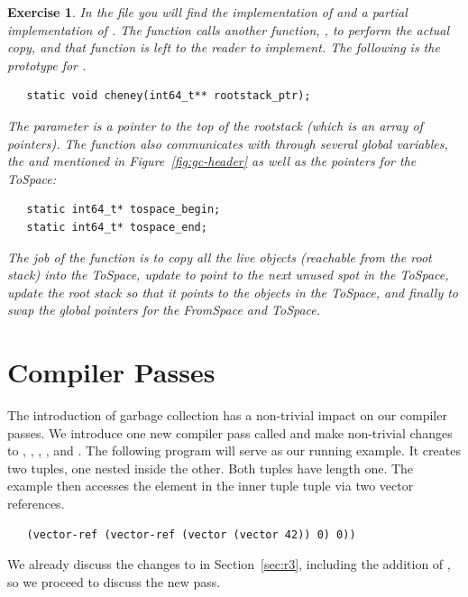 \documentclass[11pt]{book}
\newtheorem{exercise}[theorem]{Exercise}
\begin{document}
\begin{exercise}
  In the file  you will find the implementation of
   and a partial implementation of .
  The  function calls another function, ,
  to perform the actual copy, and that function is left to the reader
  to implement. The following is the prototype for .
\begin{lstlisting}
   static void cheney(int64_t** rootstack_ptr);
\end{lstlisting}
  The parameter  is a pointer to the top of the
  rootstack (which is an array of pointers).  The  function
  also communicates with  through several global
  variables, the  and 
  mentioned in Figure~\ref{fig:gc-header} as well as the pointers for
  the ToSpace:
\begin{lstlisting}
   static int64_t* tospace_begin;
   static int64_t* tospace_end;
\end{lstlisting}
  The job of the  function is to copy all the live
  objects (reachable from the root stack) into the ToSpace, update
   to point to the next unused spot in the ToSpace,
  update the root stack so that it points to the objects in the
  ToSpace, and finally to swap the global pointers for the FromSpace
  and ToSpace.
\end{exercise}


\section{Compiler Passes}
\label{sec:code-generation-gc}

The introduction of garbage collection has a non-trivial impact on our
compiler passes. We introduce one new compiler pass called
 and make non-trivial changes to
, , ,
, and .  The following
program will serve as our running example.  It creates two tuples, one
nested inside the other. Both tuples have length one. The example then
accesses the element in the inner tuple tuple via two vector
references.
\begin{lstlisting}
   (vector-ref (vector-ref (vector (vector 42)) 0) 0))
\end{lstlisting}

We already discuss the changes to  in
Section~\ref{sec:r3}, including the addition of , so we
proceed to discuss the new  pass.
\end{document}
